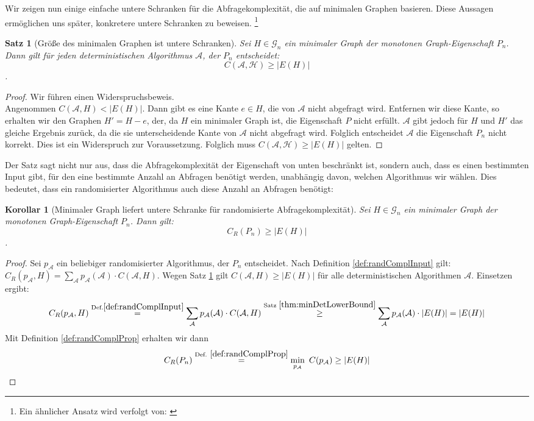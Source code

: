 \documentclass[a4paper]{scrreprt}
\newtheorem{Satz}[definition]{Satz}
\newtheorem{corollary}[definition]{Korollar}
\theoremstyle{definition}
\begin{document}
Wir zeigen nun einige einfache untere Schranken
für die Abfragekomplexität, die auf minimalen
Graphen basieren. Diese Aussagen ermöglichen uns
später, konkretere untere Schranken zu beweisen.
\footnote{Ein ähnlicher Ansatz wird verfolgt von: \cite{Groeger}}
\begin{Satz}[Größe des minimalen Graphen ist untere Schranken]
\label{thm:minDetLowerBound}
Sei $H\in \mathcal{G}_n$ ein minimaler Graph der monotonen
Graph-Eigenschaft $P_n$. Dann gilt für jeden deterministischen
Algorithmus $\mathcal{A}$, der $P_n$ entscheidet:
$$ C(\mathcal{A,H}) \geq |E(H)| $$.
\end{Satz}
\begin{proof}
Wir führen einen Widerspruchsbeweis. \\
Angenommen $ C(\mathcal{A},H) < |E(H)| $.
Dann gibt es eine Kante $e\in H$,
die von $\mathcal{A}$ nicht abgefragt wird. Entfernen wir
diese Kante, so erhalten wir den Graphen $H' = H - e$, der,
da $H$ ein minimaler Graph ist, die Eigenschaft $P$ nicht
erfüllt. $\mathcal{A}$ gibt jedoch für $H$ und $H'$ das gleiche
Ergebnis zurück, da die sie unterscheidende Kante von $\mathcal{A}$
nicht abgefragt wird. Folglich entscheidet $\mathcal{A}$ die
Eigenschaft $P_n$ nicht korrekt. Dies ist ein Widerspruch zur
Voraussetzung. Folglich muss $ C(\mathcal{A,H}) \geq |E(H)| $ gelten. 
\end{proof}
Der Satz sagt nicht nur aus, dass die Abfragekomplexität
der Eigenschaft von unten beschränkt ist, sondern auch, dass
es einen bestimmten Input gibt, für den eine bestimmte Anzahl
an Abfragen benötigt werden, unabhängig davon, welchen Algorithmus
wir wählen. Dies bedeutet, dass ein randomisierter Algorithmus
auch diese Anzahl an Abfragen benötigt:
\begin{corollary}[Minimaler Graph liefert untere Schranke für 
                  randomisierte Abfragekomplexität]
\label{cor:MinGraphRandCompl}
Sei $H\in \mathcal{G}_n$ ein minimaler Graph der monotonen
Graph-Eigenschaft $P_n$. Dann gilt:
$$C_R(P_n) \geq |E(H)|$$.
\end{corollary}
\begin{proof}
Sei $p_\mathcal{A}$ ein beliebiger randomisierter Algorithmus,
der $P_n$ entscheidet.
Nach Definition \ref{def:randComplInput} gilt: 
$ C_R(p_\mathcal{A}, H) = 
\sum_\mathcal{A} p_\mathcal{A}(\mathcal{A}) \cdot C(\mathcal{A}, H) $.
Wegen Satz \ref{thm:minDetLowerBound} gilt $C(\mathcal{A}, H) \geq |E(H)|$
für alle deterministischen Algorithmen $\mathcal{A}$. Einsetzen ergibt:
$$ C_R(p_\mathcal{A}, H) \overset{\textup{Def.} \ref{def:randComplInput}} {=}
\sum_\mathcal{A} p_\mathcal{A}(\mathcal{A}) \cdot C(\mathcal{A}, H) 
\overset{\textup{Satz } \ref{thm:minDetLowerBound}} {\geq}
\sum_\mathcal{A} p_\mathcal{A}(\mathcal{A}) \cdot |E(H)| =
|E(H)| $$
Mit Definition \ref{def:randComplProp} erhalten wir dann
$$ C_R(P_n) \overset{\textup{Def. } \ref{def:randComplProp}} {=} 
\min_{p_\mathcal{A}}\ C(p_\mathcal{A}) \geq |E(H)|$$
\end{proof}
\end{document}
